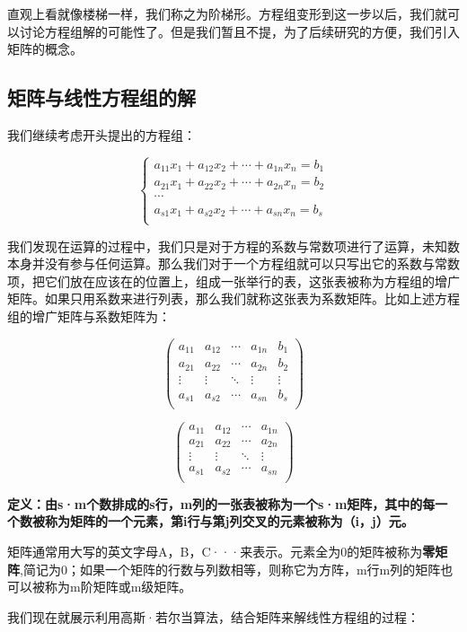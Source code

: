 \documentclass[a4paper]{ctexart}
\begin{document}
直观上看就像楼梯一样，我们称之为阶梯形。方程组变形到这一步以后，我们就可以讨论方程组解的可能性了。但是我们暂且不提，为了后续研究的方便，我们引入矩阵的概念。

\subsection{矩阵与线性方程组的解}
我们继续考虑开头提出的方程组：

$$
\begin{cases}
a_{11}x_{1}+a_{12}x_{2}+\cdots+a_{1n}x_{n}=b_{1}\\
a_{21}x_{1}+a_{22}x_{2}+\cdots+a_{2n}x_{n}=b_{2}\\
\cdots\\
a_{s1}x_{1}+a_{s2}x_{2}+\cdots+a_{sn}x_{n}=b_{s}\\
\end{cases}
$$

我们发现在运算的过程中，我们只是对于方程的系数与常数项进行了运算，未知数本身并没有参与任何运算。那么我们对于一个方程组就可以只写出它的系数与常数项，把它们放在应该在的位置上，组成一张举行的表，这张表被称为方程组的增广矩阵。如果只用系数来进行列表，那么我们就称这张表为系数矩阵。比如上述方程组的增广矩阵与系数矩阵为：

$$
\begin{pmatrix}
a_{11}&a_{12}&\cdots&a_{1n}&b_{1}\\
a_{21}&a_{22}&\cdots&a_{2n}&b_{2}\\
\vdots&\vdots&\ddots&\vdots&\vdots\\
a_{s1}&a_{s2}&\cdots&a_{sn}&b_{s}\\
\end{pmatrix}
$$

$$
\begin{pmatrix}
a_{11}&a_{12}&\cdots&a_{1n}\\
a_{21}&a_{22}&\cdots&a_{2n}\\
\vdots&\vdots&\ddots&\vdots\\
a_{s1}&a_{s2}&\cdots&a_{sn}\\
\end{pmatrix}
$$

\textbf{定义：由s·m个数排成的s行，m列的一张表被称为一个s·m矩阵，其中的每一个数被称为矩阵的一个元素，第i行与第j列交叉的元素被称为（i，j）元。}

矩阵通常用大写的英文字母A，B，C···来表示。元素全为0的矩阵被称为\textbf{零矩阵},简记为0；如果一个矩阵的行数与列数相等，则称它为方阵，m行m列的矩阵也可以被称为m阶矩阵或m级矩阵。

我们现在就展示利用高斯·若尔当算法，结合矩阵来解线性方程组的过程：
\end{document}
